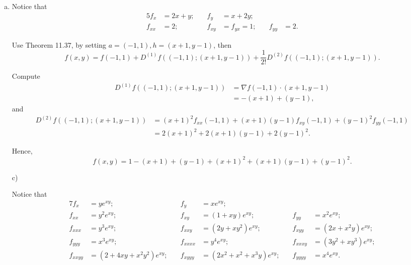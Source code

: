 \begin{Exercise}
\begin{enumerate}[a)]
\item
\begin{solution}
Notice that
\begin{alignat*}{5}
f_x &= 2x+y;&\quad f_y &= x+2y; &\quad &\quad\\
f_{x x} &= 2;&\quad f_{x y} &= f_{y x} = 1;&\quad f_{y y} &= 2.
\end{alignat*}

Use Theorem 11.37, by setting $a=(-1,1), h=(x+1,y-1)$, then
$$
f(x,y) = f(-1,1) + D^{(1)} f\left( (-1,1);(x+1,y-1)\right) + \frac{1}{2!} D^{(2)} f\left( (-1,1);(x+1,y-1) \right).
$$

Compute 
\begin{align*}
D^{(1)} f\left( (-1,1);(x+1,y-1)\right)
&= \nabla f(-1,1)\cdot(x+1,y-1) \\
&= -(x+1)+(y-1),
\end{align*}
and
\begin{align*}
D^{(2)} f\left( (-1,1);(x+1,y-1) \right)
&= (x+1)^2 f_{x x}(-1, 1) + (x+1)(y-1) f_{x y}(-1,1) + (y-1)^2 f_{y y}(-1,1) \\
&= 2(x+1)^2 + 2(x+1)(y-1) + 2(y-1)^2.
\end{align*}

Hence,
$$
f(x,y) = 1-(x+1)+(y-1)+(x+1)^2+(x+1)(y-1)+(y-1)^2.
$$
\end{solution}

\item [c)]
\begin{solution}
Notice that
\begin{alignat*}{7}
f_x &= y e^{x y}; &\quad f_y &= x e^{x y};\\
f_{x x} &= y^2 e^{x y}; &\quad f_{x y} &= (1+x y)e^{x y}; &\quad f_{y y} &= x^2 e^{x y}; \\
f_{x x x} &= y^3 e^{x y}; &\quad f_{x x y} &= (2y+x y^2)e^{x y}; &\quad f_{x y y} &= (2x+x^2 y)e^{x y}; \\
f_{y y y} &= x^3 e^{x y}; &\quad f_{x x x x} &= y^4 e^{x y}; &\quad f_{x x x y} &= (3y^2+x y^3)e^{x y}; \\
f_{x x y y} &= (2+4x y+x^2 y^2)e^{x y}; &\quad f_{x y y y} &= (2x^2+x^2+x^3 y)e^{x y}; &\quad f_{y y y y} &= x^4 e^{x y}.
\end{alignat*}


\end{solution}
\end{enumerate}
\end{Exercise}

